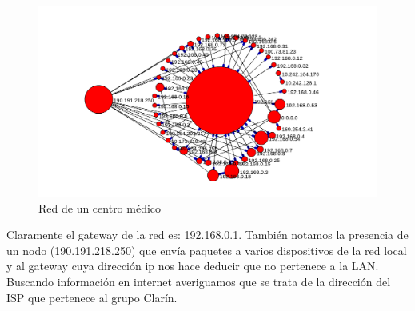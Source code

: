\begin{figure}[!h]
	\begin{center}
		  \includegraphics[scale=0.4]{Graficos/grafico_4.png}
		  \caption{Red de un centro médico}
		  \label{fig:contra1}
	\end{center}
\end{figure}

Claramente el gateway de la red es: 192.168.0.1. También notamos la presencia de un nodo (190.191.218.250) que envía paquetes a varios dispositivos de la red local y al gateway cuya dirección ip nos hace deducir que no pertenece a la LAN. Buscando información en internet averiguamos que se trata de la dirección del ISP que pertenece al grupo Clarín.	


